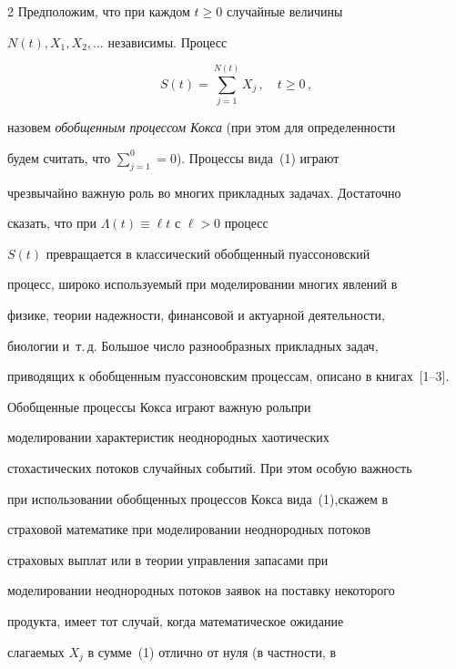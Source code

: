 \begin{multicols}{2}
Предположим, что при каждом $t\geq0$ случайные величины


$N(t),X_1,X_2,\ldots$ независимы. Процесс





\noindent


\begin{equation}


S(t)=\sum_{j=1}^{N(t)}X_j\,,\quad t\geq 0\,,


\label{e1a}


\end{equation}


назовем \textit{обобщенным процессом Кокса} (при этом для определенности


будем считать, что $\sum_{j=1}^{0} =0$). Процессы вида~(1) играют


чрезвычайно важную роль во многих прикладных задачах. Достаточно


сказать, что при $\Lambda(t) \equiv \ell t$ с $\ell > 0$ процесс


$S(t)$ превращается в классический обобщенный пуассоновский


процесс, широко используемый при моделировании многих явлений в


физике, теории надежности, финансовой и актуарной деятель\-ности,


биологии и~т.\,д. Большое число разнообразных прикладных задач,


приводящих к обобщенным пуассоновским процессам, описано в книгах~[1--3]. 


Обобщенные процессы Кокса играют важную роль\linebreak при


моделировании характеристик неоднородных хаотических


стохастических потоков случайных событий. При этом особую важность


при использовании обобщенных процессов Кокса вида~(1),\linebreak скажем в


страховой математике при моделировании неоднородных потоков


страховых выплат или в теории управления запасами при


моделировании неоднородных потоков заявок на поставку некоторого


продукта, имеет тот случай, когда математическое ожидание


слагаемых $X_j$ в сумме~(1) отлично от нуля (в частности, в



\end{multicols}
